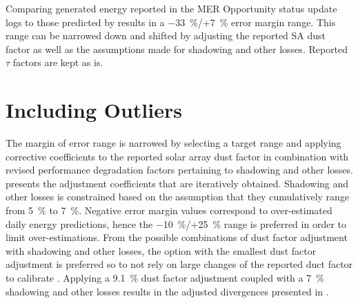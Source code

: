 Comparing generated energy reported in the \ac{MER} Opportunity status update logs to those predicted by  results in a \SI{-33}{\percent}/+\SI{7}{\percent} error margin range. This range can be narrowed down and shifted by adjusting the reported \ac{SA} dust factor as well as the assumptions made for shadowing and other losses. Reported $\tau$ factors are kept as is.

\section{Including Outliers}
\label{sec:Appendix:NarrowedEnergyPredictionErrorMarginRange:PreservingOutliers}

The margin of error range is narrowed by selecting a target range and applying corrective coefficients to the reported solar array dust factor in combination with revised performance degradation factors pertaining to shadowing and other losses.  presents the adjustment coefficients that are iteratively obtained. Shadowing and other losses is constrained based on the assumption that they cumulatively range from \SI{5}{\percent} to \SI{7}{\percent}. Negative error margin values correspond to over-estimated daily energy predictions, hence the \SI{-10}{\percent}/+\SI{25}{\percent} range is preferred in order to limit over-estimations. From the possible combinations of dust factor adjustment with shadowing and other losses, the option with the smallest dust factor adjustment is preferred so to not rely on large changes of the reported duct factor to calibrate . Applying a \SI{9.1}{\percent} dust factor adjustment coupled with a \SI{7}{\percent} shadowing and other losses results in the adjusted divergences presented in .

